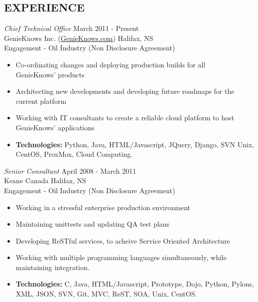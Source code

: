 \documentclass[line,margin]{res}
\begin{document}
\begin{resume}
\section{EXPERIENCE}

    {\sl Chief Technical Office} \hfill March 2011 - Present \\
    GenieKnows Inc. (\href{http://www.genieknows.com}{GenieKnows.com}) \hfill Halifax, NS \\
    Engagement - Oil Industry (Non Disclosure Agreement) \smallskip
    \begin{itemize}  \itemsep -2pt %
     \item Co-ordinating changes and deploying production builds for all \\
     GenieKnows' products 
     \item Architecting new developments and developing future roadmaps for the \\
     current platform
     \item Working with IT consultants to create a reliable cloud platform to host \\
     GenieKnows' applications 
     \item {\bf Technologies:} \hspace{1pt}
        Python, Java, HTML/Javascript, JQuery, Django, SVN \newline
        \hspace*{72pt} Unix, CentOS, ProxMox, Cloud Computing.
    \end{itemize}

   {\sl Senior Consultant} \hfill April 2008 - March 2011 \\
    Keane Canada \hfill Halifax, NS \\
    Engagement - Oil Industry (Non Disclosure Agreement) \smallskip
    \begin{itemize}  \itemsep -2pt %
     \item Working in a stressful enterprise production environment
     \item Maintaining unittests and updating QA test plans
     \item Developing ReSTful services, to acheive Service Oriented Architecture
     \item Working with multiple programming languages
            simultaneously, while \\ maintaining integration.
     \item {\bf Technologies:} \hspace{1pt}
        C, Java, HTML/Javascript, Prototype, Dojo, Python, Pylons, \newline
        \hspace*{72pt} XML, JSON, SVN, Git, MVC, ReST, SOA, Unix, CentOS.
    \end{itemize}


\end{resume}
\end{document}
